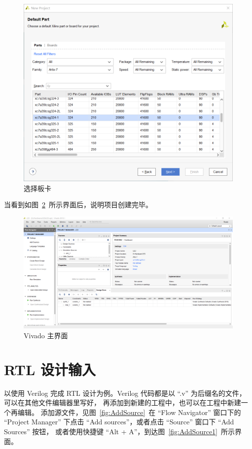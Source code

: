 \documentclass[ichigo,normal,cn]{elegantnote_mod}
\begin{document}
\begin{figure}[!htbp]
    \centering
    \includegraphics[width=.8\textwidth]{fig/Create4}
    \caption{选择板卡}
    \label{fig:Create4}
\end{figure}

当看到如图~\ref{fig:CreateDone}~所示界面后，说明项目创建完毕。

\begin{figure}[!htbp]
    \centering
    \includegraphics[width=.8\textwidth]{fig/CreateDone}
    \caption{Vivado 主界面}
    \label{fig:CreateDone}
\end{figure}

\newpage
\section{RTL 设计输入}

以使用 Verilog 完成 RTL 设计为例。Verilog 
代码都是以 “.v” 为后缀名的文件，可以在其他文件编辑器里写好，
再添加到新建的工程中，也可以在工程中新建一个再编辑。 
添加源文件，见图~\ref{fig:AddSource}~在 “Flow Navigator” 窗口下的 “Project Manager” 下点击
 “Add sources”，或者点击 “Source” 窗口下 “Add Sources” 按钮，
或者使用快捷键 “Alt + A”，到达图~\ref{fig:AddSource1}~所示界面。
\end{document}
